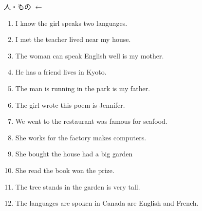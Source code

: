 \documentclass[aspectratio=169,xcolor={dvipsnames,table}]{beamer}
\begin{document}
\begin{frame}[plain]{人・もの $\leftarrow$ }
 \begin{enumerate}
  \item I know the girl  speaks two languages.
  \item I met the teacher  lived near my house.
  \item The woman  can speak English well is my mother.
  \item He has a friend  lives in Kyoto.
  \item The man  is running in the park is my father.
  \item The girl  wrote this poem is Jennifer.
  \item We went to the restaurant  was famous for seafood.
  \item She works for the factory  makes computers.
  \item She bought the house  had a big garden
  \item She read the book  won the prize.
  \item The tree  stands in the garden is very tall.
  \item The languages  are spoken in Canada are English and French.
 \end{enumerate}
\end{frame}
\end{document}

